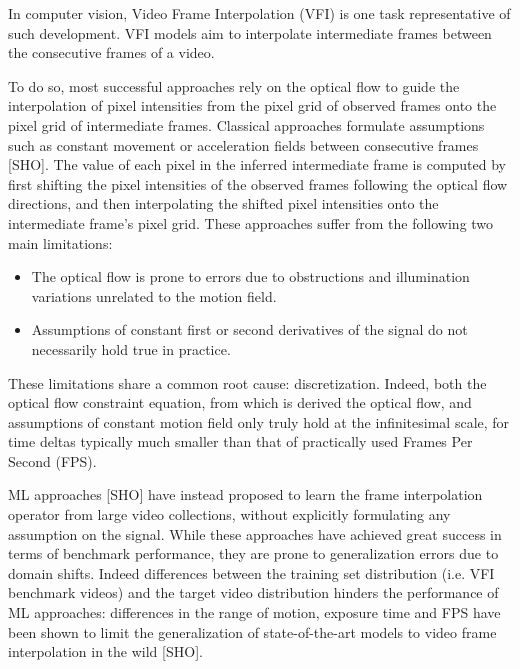 \documentclass{article}
\begin{document}
In computer vision, Video Frame Interpolation (VFI) is one task representative of such development.
VFI models aim to interpolate intermediate frames between the consecutive frames of a video.

To do so, most successful approaches rely on the optical flow
to guide the interpolation of pixel intensities from the pixel grid of observed frames onto the pixel grid of intermediate frames.
Classical approaches formulate assumptions such as constant movement or acceleration fields between consecutive frames [SHO].
The value of each pixel in the inferred intermediate frame is computed by first shifting the pixel intensities of the observed frames following the
optical flow directions, and then interpolating the shifted pixel intensities onto the intermediate frame's pixel grid.
These approaches suffer from the following two main limitations:

\begin{itemize}
\item The optical flow is prone to errors due to obstructions and illumination variations unrelated to the motion field.
\item Assumptions of constant first or second derivatives of the signal do not necessarily hold true in practice.
\end{itemize}

These limitations share a common root cause: discretization.
Indeed, both the optical flow constraint equation, from which is derived the optical flow,
and assumptions of constant motion field only truly hold at the infinitesimal scale,
for time deltas typically much smaller than that of practically used Frames Per Second (FPS).

ML approaches [SHO] have instead proposed to learn the frame interpolation operator from large video collections,
without explicitly formulating any assumption on the signal.
While these approaches have achieved great success in terms of benchmark performance,
they are prone to generalization errors due to domain shifts. %
Indeed differences between the training set distribution (i.e. VFI benchmark videos) and the target video distribution hinders the performance of ML approaches:
differences in the range of motion, exposure time and FPS have been shown to limit the
generalization of state-of-the-art models to video frame interpolation in the wild [SHO]. %
\end{document}
